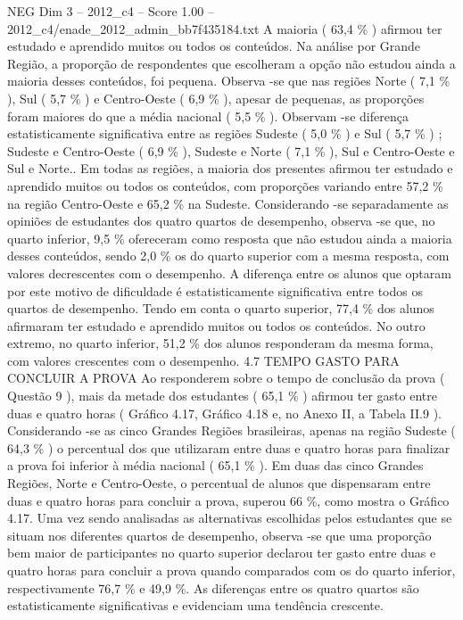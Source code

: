 \begin{textsample}{NEG Dim 3 – 2012\_c4 – Score 1.00 – 2012\_c4/enade\_2012\_admin\_bb7f435184.txt}
A maioria ( 63,4 \% ) afirmou ter estudado e aprendido muitos ou todos os conteúdos.
Na análise por Grande Região, a proporção de respondentes que escolheram a opção não estudou ainda a maioria desses conteúdos, foi pequena.
Observa -se que nas regiões Norte ( 7,1 \% ), Sul ( 5,7 \% ) e Centro-Oeste ( 6,9 \% ), apesar de pequenas, as proporções foram maiores do que a média nacional ( 5,5 \% ).
Observam -se diferença estatisticamente significativa entre as regiões Sudeste ( 5,0 \% ) e Sul ( 5,7 \% ) ; Sudeste e Centro-Oeste ( 6,9 \% ), Sudeste e Norte ( 7,1 \% ), Sul e Centro-Oeste e Sul e Norte..
Em todas as regiões, a maioria dos presentes afirmou ter estudado e aprendido muitos ou todos os conteúdos, com proporções variando entre 57,2 \% na região Centro-Oeste e 65,2 \% na Sudeste.
Considerando -se separadamente as opiniões de estudantes dos quatro quartos de desempenho, observa -se que, no quarto inferior, 9,5 \% ofereceram como resposta que não estudou ainda a maioria desses conteúdos, sendo 2,0 \% os do quarto superior com a mesma resposta, com valores decrescentes com o desempenho.
A diferença entre os alunos que optaram por este motivo de dificuldade é estatisticamente significativa entre todos os quartos de desempenho.
Tendo em conta o quarto superior, 77,4 \% dos alunos afirmaram ter estudado e aprendido muitos ou todos os conteúdos.
No outro extremo, no quarto inferior, 51,2 \% dos alunos responderam da mesma forma, com valores crescentes com o desempenho. 4.7 TEMPO GASTO PARA CONCLUIR A PROVA Ao responderem sobre o tempo de conclusão da prova ( Questão 9 ), mais da metade dos estudantes ( 65,1 \% ) afirmou ter gasto entre duas e quatro horas ( Gráfico 4.17, Gráfico 4.18 e, no Anexo II, a Tabela II.9 ).
Considerando -se as cinco Grandes Regiões brasileiras, apenas na região Sudeste ( 64,3 \% ) o percentual dos que utilizaram entre duas e quatro horas para finalizar a prova foi inferior à média nacional ( 65,1 \% ).
Em duas das cinco Grandes Regiões, Norte e Centro-Oeste, o percentual de alunos que dispensaram entre duas e quatro horas para concluir a prova, superou 66 \%, como mostra o Gráfico 4.17.
Uma vez sendo analisadas as alternativas escolhidas pelos estudantes que se situam nos diferentes quartos de desempenho, observa -se que uma proporção bem maior de participantes no quarto superior declarou ter gasto entre duas e quatro horas para concluir a prova quando comparados com os do quarto inferior, respectivamente 76,7 \% e 49,9 \%.
As diferenças entre os quatro quartos são estatisticamente significativas e evidenciam uma tendência crescente.

\end{textsample}
